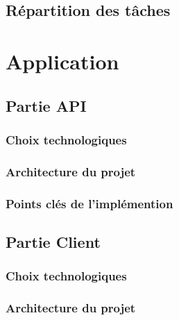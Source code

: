 \section{Répartition des tâches}

\chapter{}

\chapter{Application}
\section{Partie API}
\subsection{Choix technologiques}
\subsection{Architecture du projet}
\subsection{Points clés de l'implémention}
\section{Partie Client}
\subsection{Choix technologiques}
\subsection{Architecture du projet}

